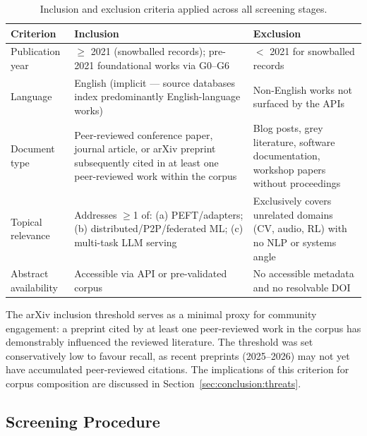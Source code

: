 \begin{table}[H]
\centering
\caption{Inclusion and exclusion criteria applied across all screening stages.}
\label{tab:ie_criteria}
\small
\setlength{\tabcolsep}{3pt}
\begin{tabularx}{\textwidth}{p{1.9cm}XX}
\toprule
\textbf{Criterion} & \textbf{Inclusion} & \textbf{Exclusion} \\
\midrule
Publication year &
  $\geq$ 2021 (snowballed records); pre-2021 foundational works via G0--G6 &
  $<$ 2021 for snowballed records \\
Language &
  English (implicit --- source databases index predominantly English-language works) &
  Non-English works not surfaced by the APIs \\
Document type &
  Peer-reviewed conference paper, journal article, or arXiv preprint subsequently cited in at least one peer-reviewed work within the corpus &
  Blog posts, grey literature, software documentation, workshop papers without proceedings \\
Topical relevance &
  Addresses $\geq$1 of: (a) PEFT/adapters; (b) distributed/P2P/federated ML; (c) multi-task LLM serving &
  Exclusively covers unrelated domains (CV, audio, RL) with no NLP or systems angle \\
Abstract availability &
  Accessible via API or pre-validated corpus &
  No accessible metadata and no resolvable DOI \\
\bottomrule
\end{tabularx}
\end{table}

The arXiv inclusion threshold serves as a minimal proxy for community engagement: a preprint cited by at least one peer-reviewed work in the corpus has demonstrably influenced the reviewed literature. The threshold was set conservatively low to favour recall, as recent preprints (2025--2026) may not yet have accumulated peer-reviewed citations. The implications of this criterion for corpus composition are discussed in Section~\ref{sec:conclusion:threats}.



\subsection{Screening Procedure}
\label{sec:methodology:screening}

